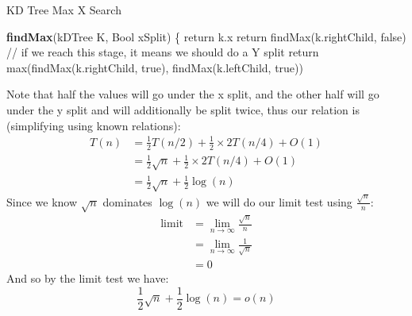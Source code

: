 \documentclass[12pt]{article}
\begin{document}
\begin{adjustwidth}{0em}{0pt}
\begin{algorithm}
\caption{KD Tree Max X Search}
\begin{algorithmic} 
\STATE \textbf{findMax}(kDTree K, Bool xSplit) \{
\STATE return k.x
\ENDIF
{} 
\STATE return findMax(k.rightChild, false)
\ENDIF
\STATE // if we reach this stage, it means we should do a Y split
\STATE return max(findMax(k.rightChild, true), findMax(k.leftChild, true))
\end{algorithmic}
\end{algorithm} Note that half the values will go under the x split, and the other half will go under the y split and will additionally be split twice, thus our relation is (simplifying using known relations):
\begin{align}
   T(n) &=\frac{1}{2}T(n/2) + \frac{1}{2}\times2T(n/4) + O(1) \\
     & =\frac{1}{2}\sqrt{n} + \frac{1}{2}\times2T(n/4) + O(1)\\
     & =\frac{1}{2}\sqrt{n} + \frac{1}{2}\log(n)
\end{align}
Since we know $\sqrt{n}$ dominates $\log(n)$ we will do our limit test using $\frac{\sqrt{n}}{n}$:
\begin{align}
   \text{limit} &=\lim_{n\rightarrow\infty}\frac{\sqrt{n}}{n} \\
     & =\lim_{n\rightarrow\infty}\frac{1}{\sqrt{n}}\\
     & =0 
\end{align}
And so by the limit test we have:
\[ \frac{1}{2}\sqrt{n} + \frac{1}{2}\log(n) = o(n)\]

\end{adjustwidth}
\end{document}

